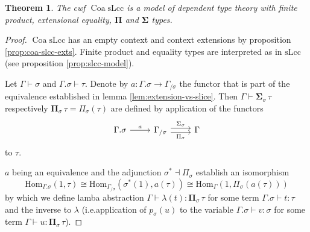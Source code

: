 \documentclass{article}
\newtheorem{theorem}{Theorem}
\theoremstyle{remark}
\theoremstyle{definition}
\begin{document}
\begin{theorem}
  \label{th:lcc-supports-types}
  The cwf $\operatorname{Coa} \mathrm{sLcc}$ is a model of dependent type theory with finite product, extensional equality, $\mathbf{\Pi}$ and $\mathbf{\Sigma}$ types.
\end{theorem}
\begin{proof}
  $\operatorname{Coa} \mathrm{sLcc}$ has an empty context and context extensions by proposition \ref{prop:coa-slcc-exts}.
  Finite product and equality types are interpreted as in $\mathrm{sLcc}$ (see proposition \ref{prop:slcc-model}).

  Let $\Gamma \vdash \sigma$ and $\Gamma.\sigma \vdash \tau$.
  Denote by $a : \Gamma.\sigma \rightarrow \Gamma_{/ \sigma}$ the functor that is part of the equivalence established in lemma \ref{lem:extension-vs-slice}.
  Then $\Gamma \vdash \mathbf{\Sigma}_\sigma \, \tau$ respectively $\mathbf{\Pi}_\sigma \, \tau = \Pi_\sigma(\tau)$ are defined by application of the functors
  \begin{equation}
    \begin{tikzcd}
      \Gamma.\sigma \arrow[r, "a"] & \Gamma_{/ \sigma} \arrow[r, shift left, "\Sigma_\sigma"] \arrow[r, shift right, "\Pi_\sigma"'] & \Gamma
    \end{tikzcd}
  \end{equation}
  to $\tau$.

  $a$ being an equivalence and the adjunction $\sigma^* \dashv \Pi_\sigma$ establish an isomorphism
  \begin{equation}
    \mathrm{Hom}_{\Gamma.\sigma}(1, \tau) \cong \mathrm{Hom}_{\Gamma_{/ \sigma}}(\sigma^*(1), a(\tau)) \cong \mathrm{Hom}_{\Gamma}(1, \Pi_\sigma(a(\tau)))
  \end{equation}
  by which we define lamba abstraction $\Gamma \vdash \lambda(t) : \mathbf{\Pi}_\sigma \, \tau$ for some term $\Gamma.\sigma \vdash t : \tau$ and the inverse to $\lambda$ (i.e.\@ application of $p_\sigma(u)$ to the variable $\Gamma.\sigma \vdash v : \sigma$ for some term $\Gamma \vdash u : \mathbf{\Pi}_\sigma \, \tau$).


\end{proof}
\end{document}
